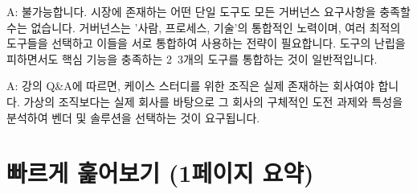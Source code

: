 \documentclass[11pt,a4paper]{article}
\begin{document}
\begin{tcolorbox}[mybox, title={Q: 거버넌스 도구 하나로 모든 것을 해결할 수 있나요?}]
A: 불가능합니다. 시장에 존재하는 어떤 단일 도구도 모든 거버넌스 요구사항을 충족할 수는 없습니다. 거버넌스는 '사람, 프로세스, 기술'의 통합적인 노력이며, 여러 최적의 도구들을 선택하고 이들을 서로 통합하여 사용하는 전략이 필요합니다. 도구의 난립을 피하면서도 핵심 기능을 충족하는 2~3개의 도구를 통합하는 것이 일반적입니다.
\end{tcolorbox}

\begin{tcolorbox}[mybox, title={Q: 케이스 스터디를 위한 조직은 가상이어도 되나요?}]
A: 강의 Q\&A에 따르면, 케이스 스터디를 위한 조직은 실제 존재하는 회사여야 합니다. 가상의 조직보다는 실제 회사를 바탕으로 그 회사의 구체적인 도전 과제와 특성을 분석하여 벤더 및 솔루션을 선택하는 것이 요구됩니다.
\end{tcolorbox}

\newpage
\section*{빠르게 훑어보기 (1페이지 요약)}
\end{document}
